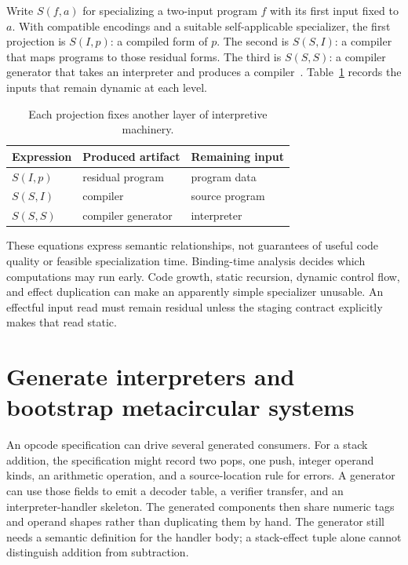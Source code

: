 Write $S(f,a)$ for specializing a two-input program $f$ with its first input fixed to $a$.
With compatible encodings and a suitable self-applicable specializer, the first projection is $S(I,p)$: a compiled form of $p$.
The second is $S(S,I)$: a compiler that maps programs to those residual forms.
The third is $S(S,S)$: a compiler generator that takes an interpreter and produces a compiler~\cite{futamura-1999-partial}.
Table~\ref{tab:ch65-projections} records the inputs that remain dynamic at each level.

\begin{table}[htbp]
\caption{Each projection fixes another layer of interpretive machinery.}
\label{tab:ch65-projections}
\centering
\begin{tabular}{lll}
\toprule
Expression & Produced artifact & Remaining input \\
\midrule
$S(I,p)$ & residual program & program data \\
$S(S,I)$ & compiler & source program \\
$S(S,S)$ & compiler generator & interpreter \\
\bottomrule
\end{tabular}
\end{table}

These equations express semantic relationships, not guarantees of useful code quality or feasible specialization time.
Binding-time analysis decides which computations may run early.
Code growth, static recursion, dynamic control flow, and effect duplication can make an apparently simple specializer unusable.
An effectful input read must remain residual unless the staging contract explicitly makes that read static.

\section{Generate interpreters and bootstrap metacircular systems}
\label{sec:ch65-generated}

An opcode specification can drive several generated consumers.
For a stack addition, the specification might record two pops, one push, integer operand kinds, an arithmetic operation, and a source-location rule for errors.
A generator can use those fields to emit a decoder table, a verifier transfer, and an interpreter-handler skeleton.
The generated components then share numeric tags and operand shapes rather than duplicating them by hand.
The generator still needs a semantic definition for the handler body; a stack-effect tuple alone cannot distinguish addition from subtraction.

